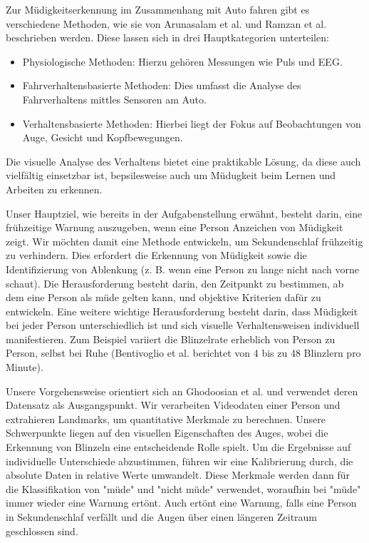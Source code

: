 Zur Müdigkeitserkennung im Zusammenhang mit Auto fahren gibt es verschiedene Methoden, wie sie von Arunasalam et al. \cite{AR20} und Ramzan et al. \cite{RA19} beschrieben werden. Diese lassen sich in drei Hauptkategorien unterteilen:

\begin{itemize}
\item Physiologische Methoden: Hierzu gehören Messungen wie Puls und EEG.
\item Fahrverhaltensbasierte Methoden: Dies umfasst die Analyse des Fahrverhaltens mittles Sensoren am Auto.
\item Verhaltensbasierte Methoden: Hierbei liegt der Fokus auf Beobachtungen von Auge, Gesicht und Kopfbewegungen.
\end{itemize}

Die visuelle Analyse des Verhaltens bietet eine praktikable Lösung, da diese auch vielfältig einsetzbar ist, bepsilesweise auch um Müdugkeit beim Lernen und Arbeiten zu erkennen.

Unser Hauptziel, wie bereits in der Aufgabenstellung erwähnt, besteht darin, eine frühzeitige Warnung auszugeben, wenn eine Person Anzeichen von Müdigkeit zeigt. Wir möchten damit eine Methode entwickeln, um Sekundenschlaf frühzeitig zu verhindern. Dies erfordert die Erkennung von Müdigkeit sowie die Identifizierung von Ablenkung (z. B. wenn eine Person zu lange nicht nach vorne schaut). Die Herausforderung besteht darin, den Zeitpunkt zu bestimmen, ab dem eine Person als müde gelten kann, und objektive Kriterien dafür zu entwickeln. Eine weitere wichtige Herausforderung besteht darin, dass Müdigkeit bei jeder Person unterschiedlich ist und sich visuelle Verhaltensweisen individuell manifestieren. Zum Beispiel variiert die Blinzelrate erheblich von Person zu Person, selbst bei Ruhe (Bentivoglio et al. \cite{BE97} berichtet von 4 bis zu 48 Blinzlern pro Minute).

Unsere Vorgehensweise orientiert sich an Ghodoosian et al. \cite{GH19} und verwendet deren Datensatz als Ausgangspunkt. Wir verarbeiten Videodaten einer Person und extrahieren Landmarks, um quantitative Merkmale zu berechnen. Unsere Schwerpunkte liegen auf den visuellen Eigenschaften des Auges, wobei die Erkennung von Blinzeln eine entscheidende Rolle spielt. Um die Ergebnisse auf individuelle Unterschiede abzustimmen, führen wir eine Kalibrierung durch, die absolute Daten in relative Werte umwandelt. Diese Merkmale werden dann für die Klassifikation von "müde" und "nicht müde" verwendet, woraufhin bei "müde" immer wieder eine Warnung ertönt. Auch ertönt eine Warnung, falls eine Person in Sekundenschlaf verfällt und die Augen über einen längeren Zeitraum geschlossen sind.

